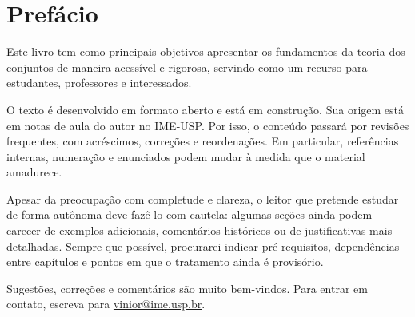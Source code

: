 \chapter{Prefácio}

Este livro tem como principais objetivos apresentar os fundamentos da teoria dos conjuntos de maneira acessível e rigorosa, servindo como um recurso para estudantes, professores e interessados.

O texto é desenvolvido em formato aberto e está em construção.
Sua origem está em notas de aula do autor no IME-USP.
Por isso, o conteúdo passará por revisões frequentes, com acréscimos, correções e reordenações.
Em particular, referências internas, numeração e enunciados podem mudar à medida que o material amadurece.

Apesar da preocupação com completude e clareza, o leitor que pretende estudar de forma autônoma deve fazê-lo com cautela: algumas seções ainda podem carecer de exemplos adicionais, comentários históricos ou de justificativas mais detalhadas.
Sempre que possível, procurarei indicar pré-requisitos, dependências entre capítulos e pontos em que o tratamento ainda é provisório.

Sugestões, correções e comentários são muito bem-vindos.
Para entrar em contato, escreva para \href{mailto:vinior@ime.usp.br}{vinior@ime.usp.br}.